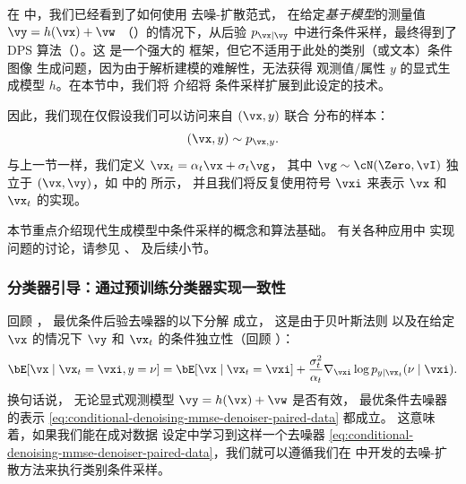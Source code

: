\documentclass[../../book-main_zh.tex]{subfiles}
\begin{document}
在  中，我们已经看到了如何使用
去噪-扩散范式，
在给定\textit{基于模型}的测量值 $\vy = h(\vx) + \vw$
（）的情况下，从后验 $p_{\vx \mid \vy}$ 中进行条件采样，最终得到了
DPS 算法（）。这
是一个强大的
框架，但它不适用于此处的类别（或文本）条件图像
生成问题，因为由于解析建模的难解性，无法获得
观测值/属性 $y$ 的显式生成模型 $h$。在本节中，我们将
介绍将
条件采样扩展到此设定的技术。

因此，我们现在仅假设我们可以访问来自 $(\vx, y)$ 联合
分布的样本：
\begin{equation}
    (\vx, y) \sim p_{\vx, y}.
\end{equation}
与上一节一样，我们定义 $\vx_t = \alpha_t \vx + \sigma_t \vg$，
其中 $\vg \sim \cN(\Zero, \vI)$ 独立于 $(\vx, \vy)$，如
 中的  所示，
并且我们将反复使用符号 $\vxi$ 来表示 $\vx$
和 $\vx_t$ 的实现。

本节重点介绍现代生成模型中条件采样的概念和算法基础。
有关各种应用中
实现问题的讨论，请参见 、
 及后续小节。

\subsubsection{分类器引导：通过预训练分类器实现一致性}

回顾 ，
最优条件后验去噪器的以下分解
成立，
这是由于贝叶斯法则
以及在给定 $\vx$ 的情况下 $\vy$ 和 $\vx_t$ 的条件独立性（回顾
）：
\begin{equation}\label{eq:conditional-denoising-mmse-denoiser-paired-data}
    \bE[ \vx \mid \vx_t=\vxi, y=\nu]
    =
    \bE[\vx \mid \vx_t=\vxi]
    + \frac{\sigma_t^2}{\alpha_t}
    \nabla_{\vxi}\log p_{y \mid \vx_t}(\nu\mid \vxi).
\end{equation}
换句话说，
无论显式观测模型 $\vy = h(\vx) + \vw$ 是否有效，
最优条件去噪器的表示
\eqref{eq:conditional-denoising-mmse-denoiser-paired-data} 都成立。
这意味着，如果我们能在成对数据
设定中学习到这样一个去噪器 \eqref{eq:conditional-denoising-mmse-denoiser-paired-data}，我们就可以遵循我们在
 中开发的去噪-扩散方法来执行类别条件采样。
\end{document}
